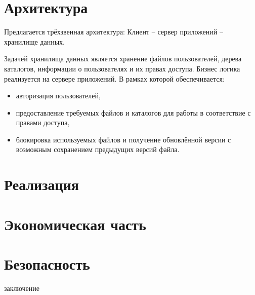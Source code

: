 \documentclass[utf8,usehyperref,12pt]{G7-32}
\begin{document}
\chapter{Архитектура}
Предлагается трёхзвенная архитектура: Клиент -- сервер приложений -- хранилище данных.

Задачей хранилища данных является хранение файлов пользователей, дерева каталогов, 
информации о пользователях и их правах доступа. Бизнес логика реализуется на сервере 
приложений. В рамках которой обеспечивается: 

\begin{itemize}
\item авторизация пользователей,
\item предоставление требуемых файлов и каталогов для работы в 
соответствие с правами доступа, 
\item блокировка используемых файлов и получение обновлённой 
версии с возможным сохранением предыдущих версий файла.
\end{itemize}
\chapter{Реализация}
\chapter{Экономическая часть}
\chapter{Безопасность}

\Conclusion
заключение
\end{document}
